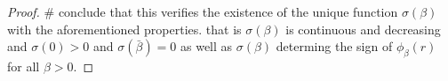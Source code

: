 \begin{proof}
\# conclude that this verifies the existence of the unique function $\sigma(\beta)$ with the aforementioned properties. that is $\sigma(\beta)$ is continuous and decreasing and $\sigma(0)>0$ and $\sigma(\bar{\beta})=0$ as well as $\sigma(\beta)$ determing the sign of $\phi_\beta(r)$ for all $\beta>0$.


\end{proof}
\clearpage
